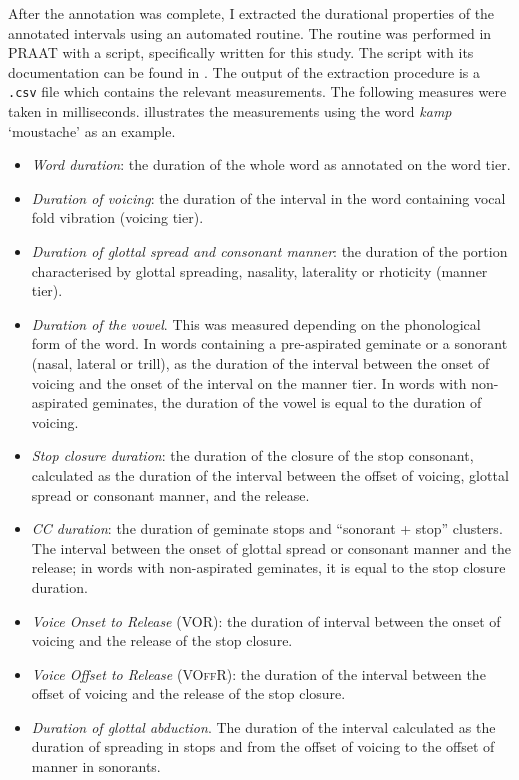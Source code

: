 \documentclass[11pt,a4paper,oneside,openany]{memoir}\usepackage[]{graphicx}\usepackage[]{color}
\begin{document}
After the annotation was complete, I extracted the durational properties of the annotated intervals using an automated routine.
The routine was performed in PRAAT with a script, specifically written for this study.
The script with its documentation can be found in .
The output of the extraction procedure is a \texttt{.csv} file which contains the relevant measurements.
The following measures were taken in milliseconds.
 illustrates the measurements using the word \textit{kamp} `moustache' as an example.

\begin{itemize}
\item \textit{Word duration}: the duration of the whole word as annotated on the word tier.
\item \textit{Duration of voicing}: the duration of the interval in the word containing vocal fold vibration (voicing tier).
\item \textit{Duration of glottal spread and consonant manner}: the duration of the portion characterised by glottal spreading, nasality, laterality or rhoticity (manner tier).
\item \textit{Duration of the vowel}.
This was measured depending on the phonological form of the word.
In words containing a pre-aspirated geminate or a sonorant (nasal, lateral or trill), as the duration of the interval between the onset of voicing and the onset of the interval on the manner tier.
In words with non-aspirated geminates, the duration of the vowel is equal to the duration of voicing.
\item \textit{Stop closure duration}: the duration of the closure of the stop consonant, calculated as the duration of the interval between the offset of voicing, glottal spread or consonant manner, and the release.
\item \textit{CC duration}: the duration of geminate stops and ``sonorant + stop'' clusters.
The interval between the onset of glottal spread or consonant manner and the release; in words with non-aspirated geminates, it is equal to the stop closure duration.
\item \textit{Voice Onset to Release} (VOR): the duration of interval between the onset of voicing and the release of the stop closure.
\item \textit{Voice Offset to Release} (\textsc{VOffR}): the duration of the interval between the offset of voicing and the release of the stop closure.
\item \textit{Duration of glottal abduction}. The duration of the interval calculated as the duration of spreading in stops and from the offset of voicing to the offset of manner in sonorants.
\end{itemize}
\end{document}
